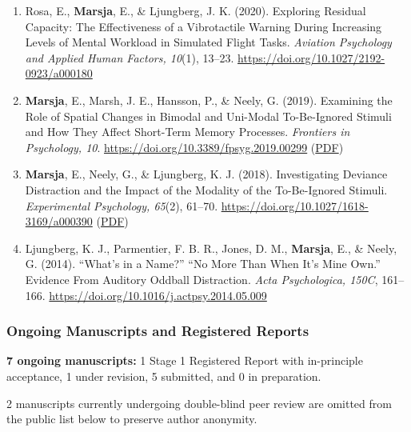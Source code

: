 \documentclass[]{article}
\begin{document}
\begin{enumerate}
{  Research, 64}(11), 4513--4523.
  \url{https://doi.org/10.1044/2021_JSLHR-20-00251}
\item
  Rosa, E., \textbf{Marsja}, E., \& Ljungberg, J. K. (2020). Exploring
  Residual Capacity: The Effectiveness of a Vibrotactile Warning During
  Increasing Levels of Mental Workload in Simulated Flight Tasks.
  \emph{Aviation Psychology and Applied Human Factors, 10}(1), 13--23.
  \url{https://doi.org/10.1027/2192-0923/a000180}
\item
  \textbf{Marsja}, E., Marsh, J. E., Hansson, P., \& Neely, G. (2019).
  Examining the Role of Spatial Changes in Bimodal and Uni-Modal
  To-Be-Ignored Stimuli and How They Affect Short-Term Memory Processes.
  \emph{Frontiers in Psychology, 10}.
  \url{https://doi.org/10.3389/fpsyg.2019.00299}
  (\href{https://tinyurl.com/spativib}{PDF})
\item
  \textbf{Marsja}, E., Neely, G., \& Ljungberg, K. J. (2018).
  Investigating Deviance Distraction and the Impact of the Modality of
  the To-Be-Ignored Stimuli. \emph{Experimental Psychology, 65}(2),
  61--70. \url{https://doi.org/10.1027/1618-3169/a000390}
  (\href{https://osf.io/amd2h/}{PDF})
\item
  Ljungberg, K. J., Parmentier, F. B. R., Jones, D. M., \textbf{Marsja},
  E., \& Neely, G. (2014). ``What's in a Name?'' ``No More Than When
  It's Mine Own.'' Evidence From Auditory Oddball Distraction.
  \emph{Acta Psychologica, 150C}, 161--166.
  \url{https://doi.org/10.1016/j.actpsy.2014.05.009}
\end{enumerate}

\subsubsection{Ongoing Manuscripts and Registered
Reports}\label{ongoing-manuscripts-and-registered-reports}

\textbf{7 ongoing manuscripts:} 1 Stage 1 Registered Report with
in-principle acceptance, 1 under revision, 5 submitted, and 0 in
preparation.

2 manuscripts currently undergoing double-blind peer review are omitted
from the public list below to preserve author anonymity.
\end{document}
